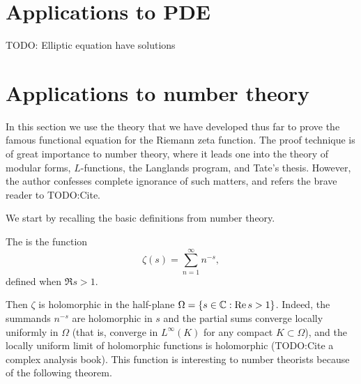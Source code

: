 \section{Applications to PDE}
TODO: Elliptic equation have solutions

\section{Applications to number theory}
In this section we use the theory that we have developed thus far to prove the famous functional equation for the Riemann zeta function.
The proof technique is of great importance to number theory, where it leads one into the theory of modular forms, $L$-functions, the Langlands program, and Tate's thesis.
However, the author confesses complete ignorance of such matters, and refers the brave reader to TODO:Cite.

We start by recalling the basic definitions from number theory.
\begin{definition}
The  is the function
$$\zeta(s) = \sum_{n=1}^\infty n^{-s},$$
defined when $\Re s > 1$.
\end{definition}
Then $\zeta$ is holomorphic in the half-plane $\Omega = \{s \in \mathbb{C}: \operatorname{Re} s > 1\}$.
Indeed, the summands $n^{-s}$ are holomorphic in $s$ and the partial sums converge locally uniformly in $\Omega$ (that is, converge in $L^\infty(K)$ for any compact $K \subset \Omega$), and the locally uniform limit of holomorphic functions is holomorphic (TODO:Cite a complex analysis book).
This function is interesting to number theorists because of the following theorem.

